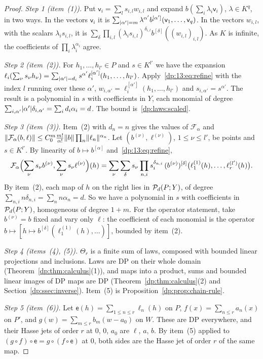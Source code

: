 \begin{proof}
\emph{Step 1 (item~(1)).} Put $\mathsf v_i=\sum_ls_{i,l}w_{i,l}$ and expand $b(\sum_i\lambda_i\mathsf v_i)$, $\lambda\in K^q$, in two ways. In the vectors $\mathsf v_i$ it is $\sum_{\lvert \alpha'\rvert=m}\lambda^{\alpha'}b^{[\alpha']}(\mathsf v_1,\dots,\mathsf v_q)$. In the vectors $w_{i,l}$, with the scalars $\lambda_is_{i,l}$, it is $\sum_\delta\prod_{i,l}(\lambda_is_{i,l})^{\delta_{i,l}}b^{[\delta]}((w_{i,l})_{i,l})$. As $K$ is infinite, the coefficients of $\prod_i\lambda_i^{\alpha_i}$ agree.

\emph{Step 2 (item~(2)).} For $h_1,\dots,h_{l'}\in P$ and $s\in K^{l'}$ we have the expansion $\ell_i(\sum_\nu s_\nu h_\nu)=\sum_{\lvert \alpha'\rvert=d_i}s^{\alpha'}\ell_i^{[\alpha']}(h_1,\dots,h_{l'})$. Apply~\eqref{dp:13:eq:refine} with the index $l$ running over these $\alpha'$, $w_{i,\alpha'}=\ell_i^{[\alpha']}(h_1,\dots,h_{l'})$ and $s_{i,\alpha'}=s^{\alpha'}$. The result is a polynomial in $s$ with coefficients in $Y$, each monomial of degree $\sum_{i,\alpha'}\lvert \alpha'\rvert\delta_{i,\alpha'}=\sum_id_i\alpha_i=d$. The bound is~\eqref{dp:laws:scaled}.

\emph{Step 3 (item~(3)).} Item~(2) with $d_n=n$ gives the values of $\mathcal F_\alpha$ and $\lVert \mathcal F_\alpha(b,\ell)\rVert\le C_0^m\frac{m!}{\alpha!}\lVert b\rVert\prod_n\lVert \ell_n\rVert^{\alpha_n}$. Let $(b^{(\nu)},\ell^{(\nu)})$, $1\le\nu\le l'$, be points and $s\in K^{l'}$. By linearity of $b\mapsto b^{[\alpha]}$ and~\eqref{dp:13:eq:refine},
\[
 \mathcal F_\alpha\Bigl(\sum_\nu s_\nu b^{(\nu)},\sum_\nu s_\nu\ell^{(\nu)}\Bigr)(h)=\sum_\nu\sum_\delta s_\nu\prod_{n,i}s_i^{\delta_{n,i}}\,(b^{(\nu)})^{[\delta]}\bigl(\ell^{(1)}_1(h),\dots,\ell^{(l')}_r(h)\bigr).
\]
By item~(2), each map of $h$ on the right lies in $\mathcal P_d(P;Y)$, of degree $\sum_{n,i}n\delta_{n,i}=\sum_nn\alpha_n=d$. So we have a polynomial in $s$ with coefficients in $\mathcal P_d(P;Y)$, homogeneous of degree $1+m$. For the operator statement, take $b^{(\nu)}=b$ fixed and vary only $\ell$: the coefficient of each monomial is the operator $b\mapsto[h\mapsto b^{[\delta]}(\ell^{(1)}_1(h),\dots)]$, bounded by item~(2).

\emph{Step 4 (items~(4), (5)).} $\Theta_r$ is a finite sum of laws, composed with bounded linear projections and inclusions. Laws are DP on their whole domain (Theorem~\ref{dp:thm:calculus}(1)), and maps into a product, sums and bounded linear images of DP maps are DP (Theorem~\ref{dp:thm:calculus}(2) and Section~\ref{dp:ssec:inverse}). Item~(5) is Proposition~\ref{dp:prop:chain-rule}.

\emph{Step 5 (item~(6)).} Let $\mathsf e(h)=\sum_{1\le n\le r}\ell_n(h)$ on $P$, $f(x)=\sum_{n\le r}a_n(x)$ on $P'$, and $g(w)=\sum_{m\le r}b_m(w-a_0)$ on $W$. These are DP everywhere, and their Hasse jets of order $r$ at $0$, $0$, $a_0$ are $\ell$, $a$, $b$. By item~(5) applied to $(g\circ f)\circ\mathsf e=g\circ(f\circ\mathsf e)$ at $0$, both sides are the Hasse jet of order $r$ of the same map.
\end{proof}

